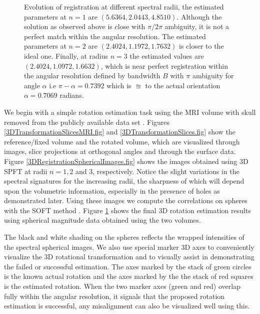 \documentclass{UCF_ETD}
\begin{document}
\begin{figure}[H]
\begin{center}
\caption{Evolution of registration at different spectral radii, the estimated parameters at $n = 1$  are $(5.6364, 2.0443, 4.8510)$. Although the solution as observed above is close with $\pi/2\pi$ ambiguity, it is not a perfect match within the angular resolution. The estimated parameters at $n = 2$ are $(2.4024,    1.1972, 1.7632)$  is closer to the ideal one. Finally, at radius $n=3$ the estimated values are $(2.4024,1.0972,1.6632)$, which is near perfect registration within the angular resolution defined by bandwidth $B$ with $\pi$ ambiguity for angle $\alpha$ i.e $\pi -\alpha = 0.7392$ which is $\approxeq$ to the actual orientation $\alpha = 0.7069$ radians.
\label{3DRegistration1.fig}}
\end{center}
\end{figure}

We begin with a simple rotation estimation task using the MRI volume with skull removed from the publicly available data set \cite{MRIDateSet}.
 Figures \ref{3DTransformationSlicesMRI.fig} and \ref{3DTransformationSlices.fig} show the reference/fixed volume and the rotated volume, which are visualized through images, slice projections at orthogonal angles and through the surface data. Figure \ref{3DRegistrationSphericalImages.fig} shows the images obtained using $3$D SPFT \cite{Alam2015} at radii  $n = 1,2$ and $3$, respectively. Notice the slight variations in the spectral signatures for the increasing radii, the sharpness of which will depend upon the volumetric information, especially in the presence of holes as demonstrated later. Using these images we compute the correlations on spheres with the SOFT method \cite{Kostelec2008}. Figure \ref{3DRegistration1.fig} shows the final $3$D rotation estimation results using spherical magnitude data obtained using the two volumes. 
 
 The black and white shading on the spheres reflects the wrapped intensities of the spectral spherical images. We also use special marker $3$D axes to conveniently visualize the $3$D rotational transformation and to visually assist in demonstrating the failed or successful estimation. The axes marked by the stack of green circles is the known actual rotation and the axes marked by the the stack of red squares is the estimated rotation. When the two marker axes (green and red) overlap fully within the angular resolution, it signals that the proposed rotation estimation is successful, any misalignment can also be visualized well using this. 
\end{document}
